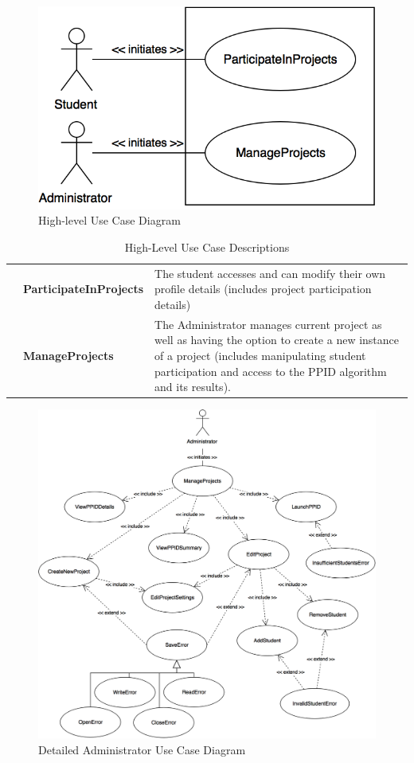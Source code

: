 \documentclass[12pt,letterpaper]{article}
\begin{document}
\begin{figure}[H]
	\centering{}
	\includegraphics[scale=0.4]{imgs/high-level-use-case-diagram.png}
	\caption{High-level Use Case Diagram}
\end{figure}

\begin{table}[H]
	\caption{High-Level Use Case Descriptions}
	\vspace{1em}
	\begin{tabu} to 
		\participateinprojects{} & ParticipateInProjects & The student accesses and can modify their own profile details 
		(includes project participation details)\\
		\manageprojects{} & ManageProjects & The Administrator manages current project as well as having the option to 
		create a new instance of a project (includes manipulating student participation and access to the PPID algorithm and its results). \\
	\end{tabu}
\end{table}

\begin{figure}[H]
	\centering{}
	\includegraphics[scale=0.26]{imgs/detailed-administrator-use-case-diagram.png}
	\caption{Detailed Administrator Use Case Diagram}
\end{figure}
\end{document}
